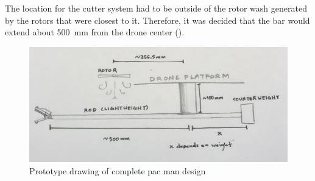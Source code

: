 \documentclass{wrcecapstone}
\begin{document}
The location for the cutter system had to be outside of the rotor wash generated by the rotors that were closest to it.  Therefore, it was decided that the bar would extend about \SI{500}{\milli\meter} from the drone center (). 
\begin{figure}
\begin{center}
\includegraphics[width=\columnwidth]{figures/fig735.png}
\end{center}
\caption{Prototype drawing of complete pac man design}
\label{fig:7.3.5}
\end{figure}
 
\end{document}
